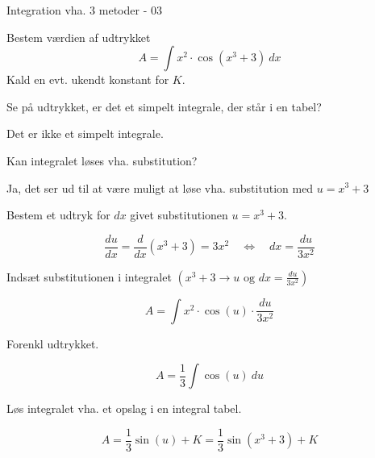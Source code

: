 \documentclass{article}
\begin{document}
\begin{exercise}{Integration vha. 3 metoder - 03}
	
	Bestem værdien af udtrykket
	\[
	A = \int x^2 \cdot \cos(x^3+3) \ dx
	\]
	Kald en evt. ukendt konstant for $K$.
	
	
	
	\hint
	Se på udtrykket, er det et simpelt integrale, der står i en tabel?
	
	\hint
	Det er ikke et simpelt integrale.
	
	\hint
	Kan integralet løses vha. substitution?
	
	\hint
	Ja, det ser ud til at være muligt at løse vha. substitution med $u=x^3+3$
	
	\hint
	Bestem et udtryk for $dx$ givet substitutionen $u=x^3+3$.
	
	\hint
	\[
	\frac{du}{dx} = \frac{d}{dx} \left(x^3+3 \right) = 3x^2 \quad \Leftrightarrow \quad dx = \frac{du}{3x^2}
	\]
	
	\hint
	Indsæt substitutionen i integralet $\left(x^3+3 \rightarrow u \textrm{ og } dx = \frac{du}{3x^2} \right)$
	
	\hint
	\[
	A =  \int x^2 \cdot \cos(u) \cdot \frac{du}{3x^2}
	\]
	
	\hint
	Forenkl udtrykket.
	
	\hint
	\[
	A= \frac{1}{3} \int \cos(u) \ du
	\]
	
	\hint
	Løs integralet vha. et opslag i en integral tabel.
	
	\hint
	\[
	A = \frac{1}{3} \sin(u) + K =  \frac{1}{3} \sin(x^3+3) + K
	\]
	
	
\end{exercise}

\newpage
\end{document}
